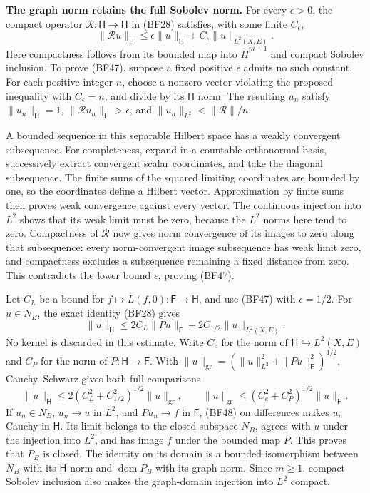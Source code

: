 \documentclass[
  11pt,
]{article}
\begin{document}
\textbf{The graph norm retains the full Sobolev norm.} For every
\(\epsilon>0\), the compact operator
\(\mathcal R:\mathsf H\to\mathsf H\) in (BF28) satisfies, with some
finite \(C_\epsilon\), \[
 \|\mathcal R u\|_{\mathsf H}
 \leq\epsilon\|u\|_{\mathsf H}
       +C_\epsilon\|u\|_{L^2(X,E)}.
 \tag{BF47}
\] Here compactness follows from its bounded map into \(\bar H^{m+1}\)
and compact Sobolev inclusion. To prove (BF47), suppose a fixed positive
\(\epsilon\) admits no such constant. For each positive integer \(n\),
choose a nonzero vector violating the proposed inequality with
\(C_\epsilon=n\), and divide by its \(\mathsf H\) norm. The resulting
\(u_n\) satisfy \(\|u_n\|_{\mathsf H}=1\),
\(\|\mathcal R u_n\|_{\mathsf H}>\epsilon\), and
\(\|u_n\|_{L^2}<\|\mathcal R\|/n\).

A bounded sequence in this separable Hilbert space has a weakly
convergent subsequence. For completeness, expand in a countable
orthonormal basis, successively extract convergent scalar coordinates,
and take the diagonal subsequence. The finite sums of the squared
limiting coordinates are bounded by one, so the coordinates define a
Hilbert vector. Approximation by finite sums then proves weak
convergence against every vector. The continuous injection into \(L^2\)
shows that its weak limit must be zero, because the \(L^2\) norms here
tend to zero. Compactness of \(\mathcal R\) now gives norm convergence
of its images to zero along that subsequence: every norm-convergent
image subsequence has weak limit zero, and compactness excludes a
subsequence remaining a fixed distance from zero. This contradicts the
lower bound \(\epsilon\), proving (BF47).

Let \(C_L\) be a bound for \(f\mapsto L(f,0):\mathsf F\to\mathsf H\),
and use (BF47) with \(\epsilon=1/2\). For \(u\in N_B\), the exact
identity (BF28) gives \[
 \|u\|_{\mathsf H}
 \leq 2C_L\|Pu\|_{\mathsf F}
       +2C_{1/2}\|u\|_{L^2(X,E)}.
 \tag{BF48}
\] No kernel is discarded in this estimate. Write \(C_e\) for the norm
of \(\mathsf H\hookrightarrow L^2(X,E)\) and \(C_P\) for the norm of
\(P:\mathsf H\to\mathsf F\). With
\(\|u\|_{\mathrm{gr}}=(\|u\|_{L^2}^2+\|Pu\|_{\mathsf F}^2)^{1/2}\),
Cauchy--Schwarz gives both full comparisons \[
 \|u\|_{\mathsf H}
 \leq2(C_L^2+C_{1/2}^2)^{1/2}\|u\|_{\mathrm{gr}},
 \qquad
 \|u\|_{\mathrm{gr}}
 \leq(C_e^2+C_P^2)^{1/2}\|u\|_{\mathsf H}.
 \tag{BF49}
\] If \(u_n\in N_B\), \(u_n\to u\) in \(L^2\), and \(Pu_n\to f\) in
\(\mathsf F\), (BF48) on differences makes \(u_n\) Cauchy in
\(\mathsf H\). Its limit belongs to the closed subspace \(N_B\), agrees
with \(u\) under the injection into \(L^2\), and has image \(f\) under
the bounded map \(P\). This proves that \(P_B\) is closed. The identity
on its domain is a bounded isomorphism between \(N_B\) with its
\(\mathsf H\) norm and \(\operatorname{dom}P_B\) with its graph norm.
Since \(m\geq1\), compact Sobolev inclusion also makes the graph-domain
injection into \(L^2\) compact.
\end{document}
